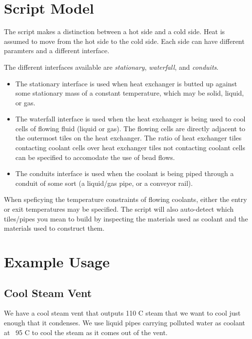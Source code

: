 \documentclass{article}
\numberwithin{equation}{subsection}
\theoremstyle{remark}
\begin{document}
\section{Script Model}

The script makes a distinction between a hot side and a cold side.
Heat is assumed to move from the hot side to the cold side.
Each side can have different paramters and a different interface.

The different interfaces available are \emph{stationary}, \emph{waterfall}, and \emph{conduits}.

\begin{itemize}
\item The stationary interface is used when heat exchanger is butted up against some stationary mass of a constant temperature, which may be solid, liquid, or gas.

\item The waterfall interface is used when the heat exchanger is being used to cool cells of flowing fluid (liquid or gas).
The flowing cells are directly adjacent to the outermost tiles on the heat exchanger.
The ratio of heat exchanger tiles contacting coolant cells over heat exchanger tiles not contacting coolant cells can be specified to accomodate the use of bead flows.

\item The conduits interface is used when the coolant is being piped through a conduit of some sort (a liquid/gas pipe, or a conveyor rail).
\end{itemize}

When speficying the temperature constraints of flowing coolants, either the entry or exit temperatures may be specified.
The script will also auto-detect which tiles/pipes you mean to build by inspecting the materials used as coolant and the materials used to construct them.

\section{Example Usage}

\subsection{Cool Steam Vent}

We have a cool steam vent that outputs 110 \degree{}C steam that we want to cool just enough that it condenses.  We use liquid pipes carrying polluted water as coolant at ~95 \degree{}C to cool the steam as it comes out of the vent.
\end{document}
